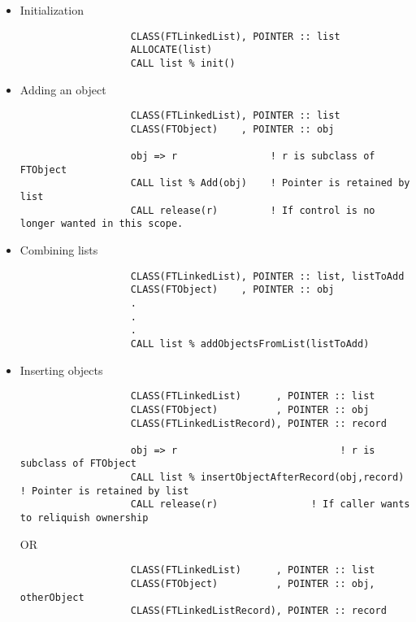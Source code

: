 \documentclass[9pt]{article}
\begin{document}
\begin{itemize}
         \item Initialization

		{\color{blue}\begin{verbatim}
	               CLASS(FTLinkedList), POINTER :: list
	               ALLOCATE(list)
	               CALL list % init()
		\end{verbatim}
}
         \item Adding an object

		{\color{blue}\begin{verbatim}
	               CLASS(FTLinkedList), POINTER :: list
	               CLASS(FTObject)    , POINTER :: obj
	
	               obj => r                ! r is subclass of FTObject
	               CALL list % Add(obj)    ! Pointer is retained by list
	               CALL release(r)         ! If control is no longer wanted in this scope.
		\end{verbatim}}
		
         \item Combining lists

		{\color{blue}\begin{verbatim}
	               CLASS(FTLinkedList), POINTER :: list, listToAdd
	               CLASS(FTObject)    , POINTER :: obj
	               .
	               .
	               .
	               CALL list % addObjectsFromList(listToAdd)
		\end{verbatim}}

         \item Inserting objects

		{\color{blue}\begin{verbatim}
	               CLASS(FTLinkedList)      , POINTER :: list
	               CLASS(FTObject)          , POINTER :: obj
	               CLASS(FTLinkedListRecord), POINTER :: record
	
	               obj => r                            ! r is subclass of FTObject
	               CALL list % insertObjectAfterRecord(obj,record) ! Pointer is retained by list
	               CALL release(r)                ! If caller wants to reliquish ownership
		\end{verbatim}}
		OR
		{\color{blue}\begin{verbatim}
	               CLASS(FTLinkedList)      , POINTER :: list
	               CLASS(FTObject)          , POINTER :: obj, otherObject
	               CLASS(FTLinkedListRecord), POINTER :: record
	

\end{verbatim}}
\end{itemize}
\end{document}
